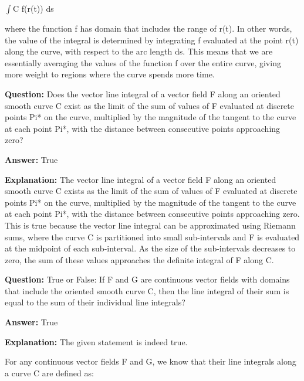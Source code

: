 \documentclass{article}
\begin{document}
\ensuremath{\int}C f(r(t)) ds

where the function f has domain that includes the range of r(t). In other words, the value of the integral is determined by integrating f evaluated at the point r(t) along the curve, with respect to the arc length ds. This means that we are essentially averaging the values of the function f over the entire curve, giving more weight to regions where the curve spends more time.
                
                \vspace{0.5cm} 
        
            
                \textbf {Question:} Does the vector line integral of a vector field F along an oriented smooth curve C exist as the limit of the sum of values of F evaluated at discrete points Pi* on the curve, multiplied by the magnitude of the tangent to the curve at each point Pi*, with the distance between consecutive points approaching zero?
                
                \textbf{Answer:} True

                \textbf{Explanation:} The vector line integral of a vector field F along an oriented smooth curve C exists as the limit of the sum of values of F evaluated at discrete points Pi* on the curve, multiplied by the magnitude of the tangent to the curve at each point Pi*, with the distance between consecutive points approaching zero. This is true because the vector line integral can be approximated using Riemann sums, where the curve C is partitioned into small sub-intervals and F is evaluated at the midpoint of each sub-interval. As the size of the sub-intervals decreases to zero, the sum of these values approaches the definite integral of F along C.
                
                \vspace{0.5cm} 
        
            
                \textbf {Question:} True or False: If F and G are continuous vector fields with domains that include the oriented smooth curve C, then the line integral of their sum is equal to the sum of their individual line integrals?
                
                \textbf{Answer:} True

                \textbf{Explanation:} The given statement is indeed true.

For any continuous vector fields F and G, we know that their line integrals along a curve C are defined as:
\end{document}
